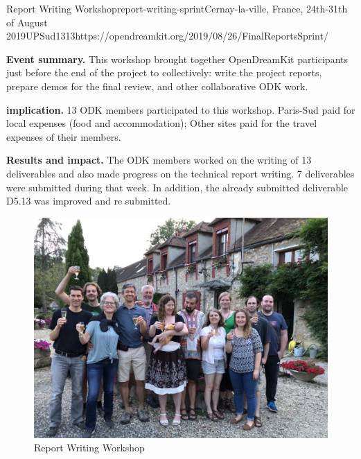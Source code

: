 \begin{event}{Report Writing Workshop}{report-writing-sprint}{Cernay-la-ville, France, 24th-31th of August 2019}{UPSud}{13}{13}{https://opendreamkit.org/2019/08/26/FinalReportsSprint/}

  \textbf{Event summary.} This workshop brought together OpenDreamKit
  participants just before the end of the project to collectively:
  write the project reports, prepare demos for the final review, and
  other collaborative ODK work.

  \textbf{\ODK implication.} 13 ODK members participated to this
  workshop. Paris-Sud paid for local expenses (food and
  accommodation); Other sites paid for the travel expenses of their
  members.

  \textbf{Results and impact.} The ODK members worked on the writing
  of 13 deliverables and also made progress on the technical report
  writing. 7 deliverables were submitted during that week. In
  addition, the already submitted deliverable D5.13 was improved and
  re submitted.

\begin{figure}[ht]
  \includegraphics[width=.75\textwidth]{2019-08-24-ReportWritingSprint.jpg}
  \caption*{Report Writing Workshop}
\end{figure}
\end{event}
